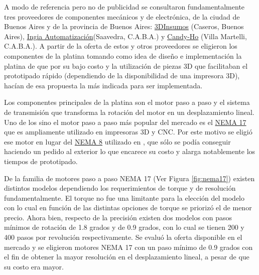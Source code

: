 A modo de referencia pero no de publicidad se consultaron fundamentalmente tres proveedores de componentes mecánicos y de electrónica, de la ciudad de Buenos Aires y de la provincia de Buenos Aires: \href{https://3dinsumos.com.ar/}{3DInsumos} (Caseros, Buenos Aires), \href{https://ingia.com.ar/}{Ingia Automatización}(Saavedra, C.A.B.A.) y \href{https://candy-ho.com/}{Candy-Ho} (Villa Martelli, C.A.B.A.). A partir de la oferta de estos y otros proveedores se eligieron los componentes de la platina tomando como idea de diseño e implementación la platina de \cite{schaa} que por su bajo costo y la utilización de piezas 3D que facilitaban el prototipado rápido (dependiendo de la disponibilidad de una impresora 3D), hacían de esa propuesta la más indicada para ser implementada.

Los componentes principales de la platina son el motor paso a paso y el sistema de transmisión que transforma la rotación del motor en un desplazamiento lineal. Uno de los sino el motor paso a paso más popular del mercado es el \href{https://www.pololu.com/product/1200}{NEMA 17} que es ampliamente utilizado en impresoras 3D y CNC. Por este motivo se eligió ese motor en lugar del \href{https://www.pololu.com/product/1204}{NEMA 8} utilizado en \cite{schaa}, que sólo se podía conseguir haciendo un pedido al exterior lo que encarece su costo y alarga notablemente los tiempos de prototipado.

De la familia de motores paso a paso NEMA 17 (Ver Figura \ref{fig:nema17}) existen distintos modelos dependiendo los requerimientos de torque y de resolución fundamentalmente. El torque no fue una limitante para la elección del modelo con lo cual en función de las distintas opciones de torque se priorizó el de menor precio. Ahora bien, respecto de la precisión existen dos modelos con pasos mínimos de rotación de 1.8 grados y de 0.9 grados, con lo cual se tienen 200 y 400 pasos por revolución respectivamente. Se evaluó la oferta disponible en el mercado y se eligieron motores NEMA 17 con un paso mínimo de 0.9 grados con el fin de obtener la mayor resolución en el desplazamiento lineal, a pesar de que su costo era mayor.

